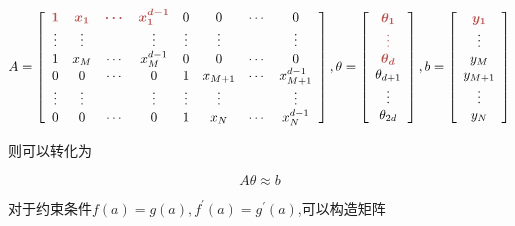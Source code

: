 \begin{notation}
    \begin{equation}\displaystyle A=\left[\begin{array}{ c c c c c c c c }
        \textcolor[rgb]{0.72,0.33,0.31}{\boldsymbol{1}} & \textcolor[rgb]{0.72,0.33,0.31}{\boldsymbol{x_{1}}} & \textcolor[rgb]{0.72,0.33,0.31}{\boldsymbol{\cdots }} & \textcolor[rgb]{0.72,0.33,0.31}{\boldsymbol{x_{1}^{d-1}}} & 0 & 0 & \cdots  & 0\\
        \vdots  & \vdots  &  & \vdots  & \vdots  & \vdots  &  & \vdots \\
        1 & x_{M} & \cdots  & x_{M}^{d-1} & 0 & 0 & \cdots  & 0\\
        0 & 0 & \cdots  & 0 & 1 & x_{M+1} & \cdots  & x_{M+1}^{d-1}\\
        \vdots  & \vdots  &  & \vdots  & \vdots  & \vdots  &  & \vdots \\
        0 & 0 & \cdots  & 0 & 1 & x_{N} & \cdots  & x_{N}^{d-1}
        \end{array}\right] ,\theta =\left[\begin{array}{ c }
        \textcolor[rgb]{0.72,0.33,0.31}{\boldsymbol{\theta _{1}}}\\
        \textcolor[rgb]{0.72,0.33,0.31}{\boldsymbol{\vdots }}\\
        \textcolor[rgb]{0.72,0.33,0.31}{\boldsymbol{\theta _{d}}}\\
        \theta _{d+1}\\
        \vdots \\
        \theta _{2d}
        \end{array}\right] ,b=\left[\begin{array}{ c }
        \textcolor[rgb]{0.72,0.33,0.31}{\boldsymbol{y_{1}}}\\
        \vdots \\
        y_{M}\\
        y_{M+1}\\
        \vdots \\
        y_{N}
        \end{array}\right]\end{equation}
\end{notation}

则可以转化为

\begin{equation} A \theta \approx b \end{equation}

对于约束条件$f(a)=g(a), f^{\prime}(a)=g^{\prime}(a)$,可以构造矩阵

